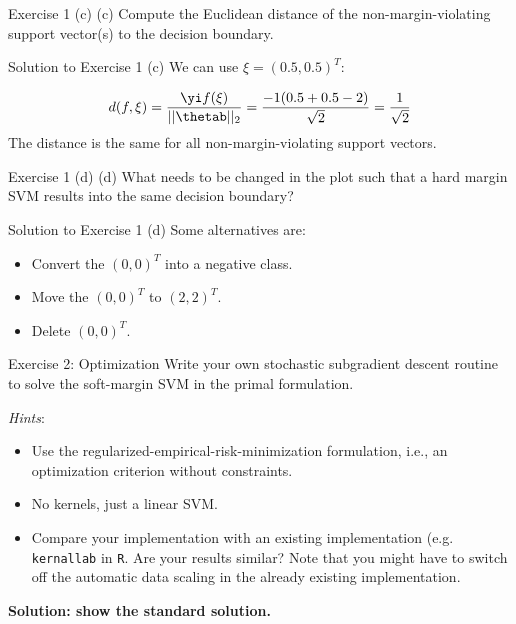 \documentclass[aspectratio=169]{beamer}
\begin{document}
\begin{frame}{Exercise 1 (c)}
	(c) Compute the Euclidean distance of the non-margin-violating support vector(s) to the decision boundary.
\end{frame}

\begin{frame}{Solution to Exercise 1 (c)}
	We can use $\xi = (0.5, 0.5)^T$:
	
	\begin{align*}
		d(f, \xi) = \frac{\yi f(\xi)}{||\thetab||_2} = \frac{-1 (0.5 + 0.5 - 2)}{\sqrt{2}} = \frac{1}{\sqrt{2}}
	\end{align*}
	The distance is the same for all non-margin-violating support vectors.
\end{frame}


\begin{frame}{Exercise 1 (d)}
	(d) What needs to be changed in the plot such that a hard margin SVM results into the same decision boundary?
\end{frame}

\begin{frame}{Solution to Exercise 1 (d)}
	Some alternatives are:
	\begin{itemize}
		\item<2-> Convert the $(0, 0)^T$ into a negative class.
		\item<3-> Move the $(0, 0)^T$ to $(2, 2)^T$.
		\item<4-> Delete $(0, 0)^T$.
	\end{itemize}
\end{frame}

\begin{frame}{Exercise 2: Optimization}
	Write your own stochastic subgradient descent routine to solve the soft-margin SVM in the primal formulation.
	
	\emph{Hints}:
	\begin{itemize}
		\item Use the regularized-empirical-risk-minimization formulation, i.e., an optimization criterion without constraints.
		\item No kernels, just a linear SVM.
		\item Compare your implementation with an existing implementation (e.g. \texttt{kernallab} in \texttt{R}. Are your results similar? Note that you might have to switch off the automatic data scaling in the already existing implementation.
	\end{itemize}
	
	\textbf{Solution: show the standard solution.}
\end{frame}
\end{document}
